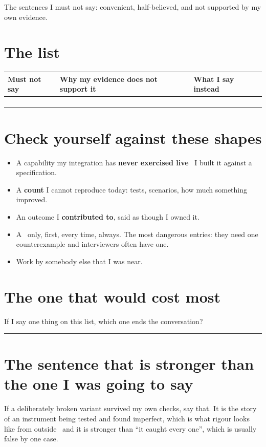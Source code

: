 


The sentences I must not say: convenient, half-believed, and not supported by
my own evidence.

\section{The list}
\small
\begin{tabularx}{\linewidth}{@{}XXX@{}}
\toprule
\textbf{Must not say} & \textbf{Why my evidence does not support it} & \textbf{What I say instead} \\
\midrule
\rule{0pt}{16pt} & & \\
\rule{0pt}{16pt} & & \\
\rule{0pt}{16pt} & & \\
\rule{0pt}{16pt} & & \\
\bottomrule
\end{tabularx}
\normalsize

\section{Check yourself against these shapes}
\begin{itemize}
  \item A capability my integration has \textbf{never exercised live} \dash\ I
        built it against a specification.
  \item A \textbf{count} I cannot reproduce today: tests, scenarios, how much
        something improved.
  \item An outcome I \textbf{contributed to}, said as though I owned it.
  \item A  \dash\ only, first, every time, always. The most
        dangerous entries: they need one counterexample and interviewers often
        have one.
  \item Work by somebody else that I was near.
\end{itemize}

\section{The one that would cost most}
If I say one thing on this list, which one ends the conversation?
\par\vspace{4pt}\rule{\linewidth}{0.4pt}\par\vspace{7pt}

\section{The sentence that is stronger than the one I was going to say}
{\color{kitgrey}If a deliberately broken variant survived my own checks, say
that. It is the story of an instrument being tested and found imperfect, which
is what rigour looks like from outside \dash\ and it is stronger than
``it caught every one'', which is usually false by one case.}


